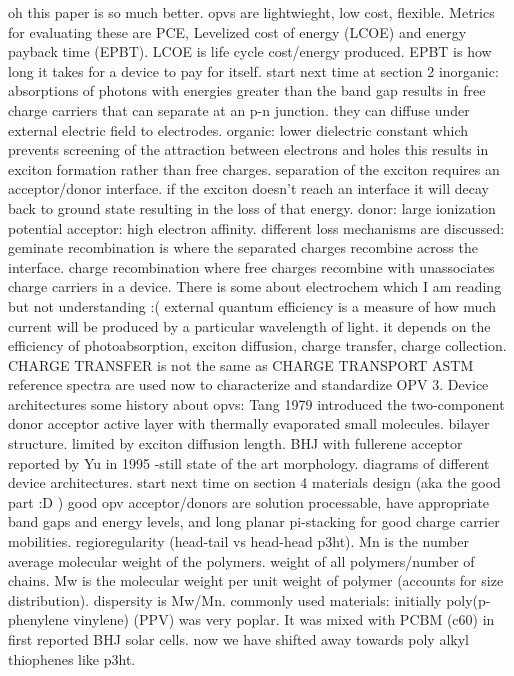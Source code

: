 \documentclass{article}
\begin{document}
oh this paper is so much better. 
opvs are lightwieght, low cost, flexible. Metrics for evaluating these are PCE, Levelized cost of energy (LCOE) and energy payback time (EPBT).
LCOE is life cycle cost/energy produced. EPBT is how long it takes for a device to pay for itself.
start next time at section 2
inorganic: absorptions of photons with energies greater than the band gap results in free charge carriers that can separate at an p-n junction. they can diffuse under external electric field to electrodes.
organic: lower dielectric constant which prevents screening of the attraction between electrons and holes this results in exciton formation rather than free charges. separation of the exciton requires an acceptor/donor interface. if the exciton doesn't reach an interface it will decay back to ground state resulting in the loss of that energy. donor: large ionization potential acceptor: high electron affinity.
different loss mechanisms are discussed: geminate recombination is where the separated charges recombine across the interface. charge recombination where free charges recombine with unassociates charge carriers in a device.
There is some about electrochem which I am reading but not understanding :( external quantum efficiency is a measure of how much current will be produced by a particular wavelength of light. it depends on the efficiency of photoabsorption, exciton diffusion, charge transfer, charge collection.
CHARGE TRANSFER is not the same as CHARGE TRANSPORT
ASTM reference spectra are used now to characterize and standardize OPV
3. Device architectures
some history about opvs: Tang 1979 introduced the two-component donor acceptor active layer with thermally evaporated small molecules. bilayer structure. limited by exciton diffusion length. 
BHJ with fullerene acceptor reported by Yu in 1995 -still state of the art morphology.
diagrams of different device architectures.
start next time on section 4
materials design (aka the good part :D )
good opv acceptor/donors are solution processable, have appropriate band gaps and energy levels, and long planar pi-stacking for good charge carrier mobilities.
regioregularity (head-tail vs head-head p3ht). Mn is the number average molecular weight of the polymers. weight of all polymers/number of chains. Mw is the molecular weight per unit weight of polymer (accounts for size distribution). dispersity is Mw/Mn.
commonly used materials: initially poly(p-phenylene vinylene) (PPV) was very poplar. It was mixed with PCBM (c60) in first reported BHJ solar cells. now we have shifted away towards poly alkyl thiophenes like p3ht.
\end{document}
